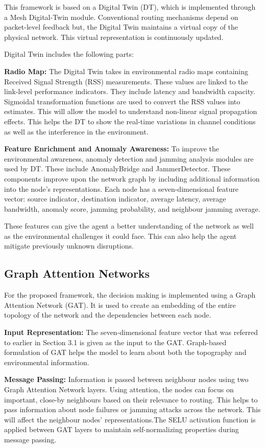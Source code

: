 \documentclass[conference]{IEEEtran}
\begin{document}
This framework is based on a Digital Twin (DT), which is implemented through a Mesh Digital-Twin module. Conventional routing mechanisms depend on packet-level feedback but, the Digital Twin maintains a virtual copy of the physical network. This virtual representation is continuously updated.

Digital Twin includes the following parts:

\textbf{Radio Map:} The Digital Twin takes in environmental radio maps containing Received Signal Strength (RSS) measurements. These values are linked to the link-level performance indicators. They include latency and bandwidth capacity. Sigmoidal transformation functions are used to convert the RSS values into estimates. This will allow the model to understand non-linear signal propagation effects. This helps the DT to show the real-time variations in channel conditions as well as the interference in the environment.

\textbf{Feature Enrichment and Anomaly Awareness:} To improve the environmental awareness, anomaly detection and jamming analysis modules are used by DT. These include AnomalyBridge and JammerDetector. These components improve upon the network graph by including additional information into the node's representations. Each node has a seven-dimensional feature vector: source indicator, destination indicator, average latency, average bandwidth, anomaly score, jamming probability, and neighbour jamming average.

These features can give the agent a better understanding of the network as well as the environmental challenges it could face. This can also help the agent mitigate previously unknown disruptions.

\subsection{Graph Attention Networks}

For the proposed framework, the decision making is implemented using a Graph Attention Network (GAT). It is used to create an embedding of the entire topology of the network and the dependencies between each node.

\textbf{Input Representation:} The seven-dimensional feature vector that was referred to earlier in Section 3.1 is given as the input to the GAT. Graph-based formulation of GAT helps the model to learn about both the topography and environmental information.

\textbf{Message Passing:} Information is passed between neighbour nodes using two Graph Attention Network layers. Using attention, the nodes can focus on important, close-by neighbours based on their relevance to routing. This helps to pass information about node failures or jamming attacks across the network. This will affect the neighbour nodes' representations.The SELU activation function is applied between GAT layers to maintain self-normalizing properties during message passing.
\end{document}
